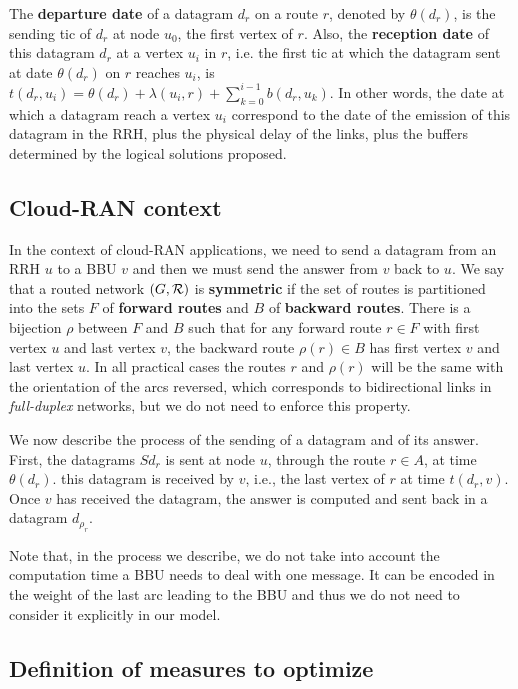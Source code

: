 \documentclass[french]{article}
\begin{document}
The \textbf{departure date} of a datagram $d_r$ on a route $r$, denoted by $\theta(d_r)$, is the sending tic of $d_r$ at node $u_0$, the first vertex of $r$. 
 Also, the \textbf{reception date} of this datagram $d_r$ at a vertex $u_i$ in $r$, i.e. the first tic at which the datagram sent at date $\theta(d_r)$ on $r$ reaches $u_i$, is $t(d_r,u_i) = \theta(d_r) + \lambda(u_i,r) + \sum_{k=0}^{i-1} b(d_r,u_k) $. In other words, the date at which a datagram reach a vertex $u_i$ correspond to the date of the emission of this datagram in the RRH, plus the physical delay of the links, plus the buffers determined by the logical solutions proposed.
 
  \subsection{Cloud-RAN context}
     
      In the context of cloud-RAN applications, we need to send a datagram from an RRH $u$ to a BBU $v$ and then 
      we must send the answer from $v$ back to $u$. We say that a routed network $(G, {\cal R})$ is \textbf{symmetric} if the set of routes is partitioned into the sets $F$ of \textbf{forward routes} and $B$ of \textbf{backward routes}. There is a bijection $\rho$ between $F$ and $B$ such that for any forward route $r \in F$ with first vertex $u$ and last vertex $v$, the backward route $\rho(r) \in B$ has first vertex $v$ and last vertex $u$. In all practical cases the routes $r$ and $\rho(r)$ will be the same with the orientation of the arcs reversed, which corresponds to bidirectional links in \emph{full-duplex} networks, but we do not need to enforce this property.
      
     We now describe the process of the sending of a datagram and of its answer. First, the datagrams $Sd_r$ is sent at node $u$, through the route $r \in A$, at time $\theta(d_r)$.
      this datagram is received by $v$, i.e., the last vertex of $r$ at time $t(d_r,v)$. 
     Once $v$ has received the datagram, the answer is computed and sent back in a datagram $d_{\rho_r}$. 
     

     Note that, in the process we describe, we do not take into account the computation time a BBU needs to deal with one message. It can be encoded in the weight of the last arc leading to the BBU and thus we do not need to consider it explicitly in our model. 

     
     \subsection{Definition of measures to optimize}
             
\end{document}
